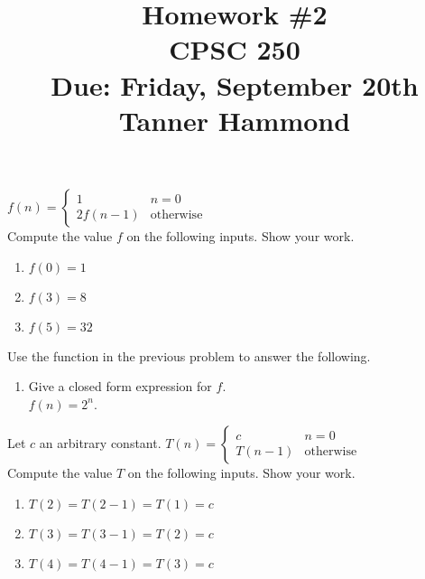 \documentclass[12pt]{article}
\newenvironment{problem}[2][Problem]{\begin{trivlist}
\item[\hskip \labelsep {\bfseries #1}\hskip \labelsep {\bfseries #2.}]}{\end{trivlist}}
\begin{document}

\title{Homework \#2 \\ CPSC 250 \\ Due: Friday, September 20th \\ Tanner Hammond}%
\date{}

\maketitle

\begin{problem}{1}
$f(n) = \begin{cases}
      1  & n = 0 \\
      2f(n-1) & \text{otherwise}
 \end{cases}$\\
Compute the value $f$ on the following inputs. Show your work.
\begin{enumerate}
\item $f(0) = 1$
\item $f(3) = 8$
\item $f(5) = 32$
\end{enumerate}
\end{problem}

\begin{problem}{2}
Use the function in the previous problem to answer the following.
\begin{enumerate}
 \item Give a closed form expression for $f$.\\
 $f(n) = 2^n$.
\end{enumerate}
\end{problem}

\begin{problem}{3} Let $c$ an arbitrary constant.
$T(n) = \begin{cases}
      c  & n = 0 \\
      T(n-1) & \text{otherwise}
 \end{cases}$\\
Compute the value $T$ on the following inputs. Show your work.
\begin{enumerate}
\item $T(2) = T(2-1) = T(1) = c$
\item $T(3) = T(3-1) = T(2) = c$
\item $T(4) = T(4-1) = T(3) = c$
\end{enumerate}
\end{problem}
\end{document}
